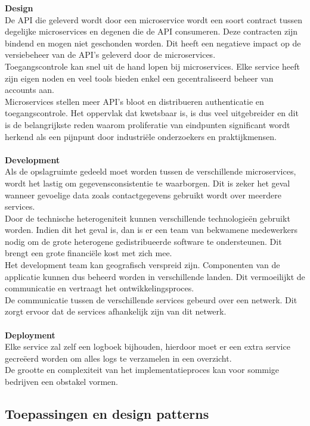 \textbf{Design} \\De API die geleverd wordt door een microservice wordt een soort contract tussen degelijke microservices en degenen die de API consumeren. Deze contracten zijn bindend en mogen niet geschonden worden. Dit heeft een negatieve impact op de versiebeheer van de API's geleverd door de microservices.\\    Toegangscontrole kan snel uit de hand lopen bij microservices. Elke service heeft zijn eigen noden en veel tools bieden enkel een gecentraliseerd beheer van accounts aan.\\    Microservices stellen meer API's bloot en distribueren authenticatie en toegangscontrole. Het oppervlak dat kwetsbaar is, is dus veel uitgebreider en dit is de belangrijkste reden waarom proliferatie van eindpunten significant wordt herkend als een pijnpunt door industriële onderzoekers en praktijkmensen.\\  \\
\textbf{Development} \\ Als de opslagruimte gedeeld moet worden tussen de verschillende microservices, wordt het lastig om gegevensconsistentie te waarborgen. Dit is zeker het geval wanneer gevoelige data zoals contactgegevens gebruikt wordt over meerdere services.\\
Door de technische heterogeniteit kunnen verschillende technologieën gebruikt worden. Indien dit het geval is, dan is er een team van bekwamene medewerkers nodig om de grote heterogene gedistribueerde software te ondersteunen. Dit brengt een grote financiële kost met zich mee.\\
Het development team kan geografisch verspreid zijn. Componenten van de applicatie kunnen dus beheerd worden in verschillende landen. Dit vermoeilijkt de communicatie en vertraagt het ontwikkelingsproces.\\
De communicatie tussen de verschillende services gebeurd over een netwerk. Dit zorgt ervoor dat de services afhankelijk zijn van dit netwerk.\\ \\
\textbf{Deployment} \\ Elke service zal zelf een logboek bijhouden, hierdoor moet er een extra service gecreëerd worden om alles logs te verzamelen in een overzicht.\\
De grootte en complexiteit van het implementatieproces kan voor sommige bedrijven een obstakel vormen.

\subsection{Toepassingen en design patterns}


